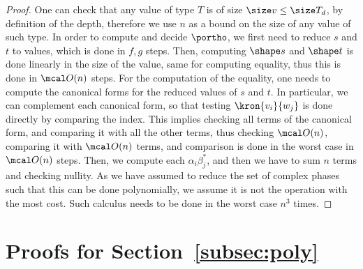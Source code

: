 \begin{proof}
  One can check that any value of type $T$ is of size $\size v \leq \size T_d$,
  by definition of the depth, therefore we use $n$ as a bound on the size of
  any value of such type. In order to compute and decide $\portho$, we first
  need to reduce $s$ and $t$ to values, which is done in $f, g$ steps. Then,
  computing $\shape s$ and $\shape t$ is done linearly in the size of the
  value, same for computing equality, thus this is done in $\mcal O(n)$ steps.
  For the computation of the equality, one needs to compute the canonical forms
  for the reduced values of $s$ and $t$. In particular, we can complement each
  canonical form, so that testing $\kron{v_i}{w_j}$ is done directly by
  comparing the index. This implies checking all terms of the canonical form,
  and comparing it with all the other terms, thus checking $\mcal O(n)$,
  comparing it with $\mcal O(n)$ terms, and comparison is done in the worst
  case in $\mcal O(n)$ steps. Then, we compute each $\alpha_i \beta_j^*$, and
  then we have to sum $n$ terms and checking nullity. As we have assumed to
  reduce the set of complex phases such that this can be done polynomially, we
  assume it is not the operation with the most cost. Such calculus needs to be
  done in the worst case $n^3$ times.
\end{proof}

\section{Proofs for Section~\ref{subsec:poly}}

\circuitbound*


